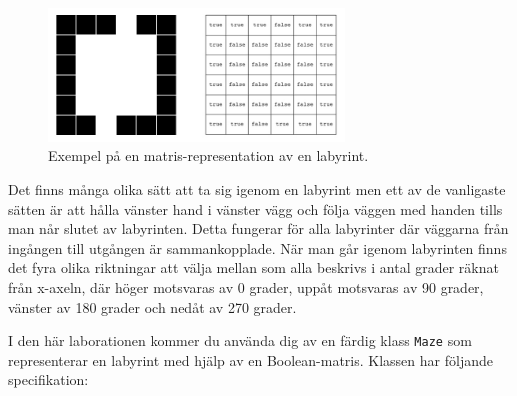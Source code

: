 \begin{figure}[h]
	\begin{center}
		\includegraphics[width=0.7\textwidth]{../img/w09-lab/MazeAndMatrix.jpg}
	\end{center}
	\caption{Exempel på en matris-representation av en labyrint.}
\end{figure}

Det finns många olika sätt att ta sig igenom en labyrint men ett av de vanligaste sätten är att hålla vänster hand i vänster vägg och följa väggen med handen tills man når slutet av labyrinten. Detta fungerar för alla labyrinter där väggarna från ingången till utgången är sammankopplade. När man går igenom labyrinten finns det fyra olika riktningar att välja mellan som alla beskrivs i antal grader räknat från x-axeln, där höger motsvaras av 0 grader, uppåt motsvaras av 90 grader, vänster av 180 grader och nedåt av 270 grader.



I den här laborationen kommer du använda dig av en färdig klass \texttt{Maze} som representerar en labyrint med hjälp av en Boolean-matris. Klassen har följande specifikation:


